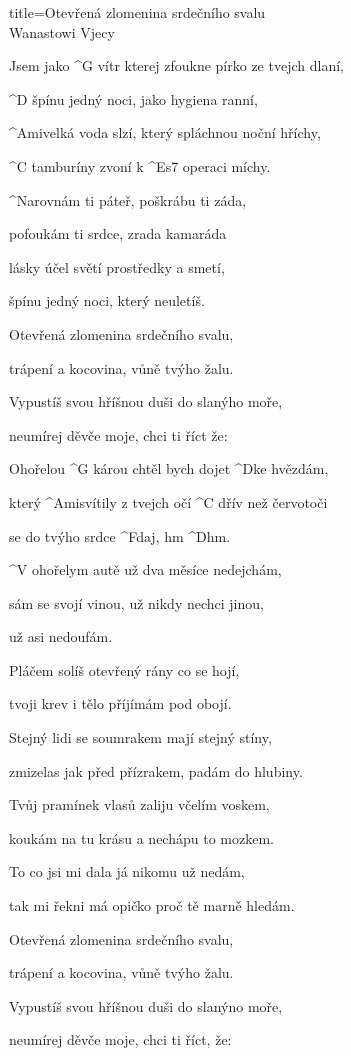 \begin{song}{title=\predtitle\centering Otevřená zlomenina srdečního svalu \\\large Wanastowi Vjecy \vspace*{-0.3cm}}  %
\begin{centerjustified}

\sloka 
	Jsem jako ^{G\,\,}vítr kterej zfoukne pírko ze tvejch dlaní,

	^{D \z}špínu jedný noci, jako hygiena ranní,

	^{Ami}velká voda slzí, který spláchnou noční hříchy, 

	^{C \z}tamburíny zvoní k ^{Es7 \z}operaci míchy.
	
	^{\phantom{.}}Narovnám ti páteř, poškrábu ti záda, 
	
	pofoukám ti srdce, zrada kamaráda

	lásky účel světí prostředky a smetí, 
	
	špínu jedný noci, který neuletíš.

	Otevřená zlomenina srdečního svalu, 
	
	trápení a kocovina, vůně tvýho žalu.
	
	Vypustíš svou hříšnou duši do slanýho moře, 
	
	neumírej děvče moje, chci ti říct že:


	Ohořelou ^{G \z}károu chtěl bych dojet ^{D}ke hvězdám,

	který ^{Ami}svítily z tvejch očí ^{C \z}dřív než červotoči 

	se do tvýho srdce ^{F}daj, hm ^{D}hm.
	
	^{\phantom{.}}V ohořelym autě už dva měsíce nedejchám,
	
	sám se svojí vinou, už nikdy nechci jinou, 
	
	už asi nedoufám.

\sloka
	Pláčem solíš otevřený rány co se hojí, 
	
	tvoji krev i tělo příjímám pod obojí.

	Stejný lidi se soumrakem mají stejný stíny, 
	
	zmizelas jak před přízrakem, padám do hlubiny.
	
	Tvůj pramínek vlasů zaliju včelím voskem, 
	
	koukám na tu krásu a nechápu to mozkem.
	
	To co jsi mi dala já nikomu už nedám, 
	
	tak mi řekni má opičko proč tě marně hledám.

	Otevřená zlomenina srdečního svalu, 
	
	trápení a kocovina, vůně tvýho žalu.
	
	Vypustíš svou hříšnou duši do slanýno moře, 

	neumírej děvče moje, chci ti říct, že:




\end{centerjustified}
\setcounter{Slokočet}{0}
\end{song}
